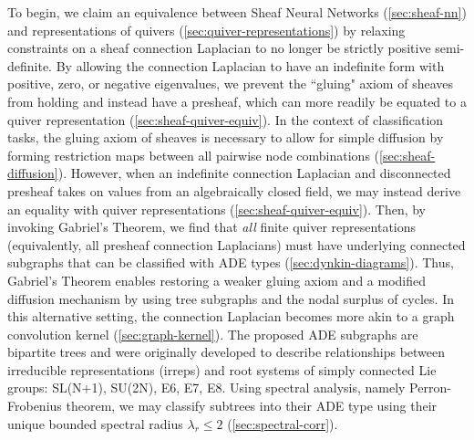 \documentclass{article}
\theoremstyle{definition}
\begin{document}

To begin, we claim an equivalence between Sheaf Neural Networks (\cref{sec:sheaf-nn}) and representations of quivers (\cref{sec:quiver-representations}) by relaxing constraints on a sheaf connection Laplacian to no longer be strictly positive semi-definite. 
By allowing the connection Laplacian to have an indefinite form with positive, zero, or negative eigenvalues, we prevent the ``gluing" axiom of sheaves from holding and instead have a presheaf, which can more readily be equated to a quiver representation (\cref{sec:sheaf-quiver-equiv}). 
In the context of classification tasks, the gluing axiom of sheaves is necessary to allow for simple diffusion by forming restriction maps between all pairwise node combinations (\cref{sec:sheaf-diffusion}). 
However, when an indefinite connection Laplacian and disconnected presheaf takes on values from an algebraically closed field, we may instead derive an equality with quiver representations (\cref{sec:sheaf-quiver-equiv}). Then, by invoking Gabriel's Theorem, we find that \textit{all} finite quiver representations (equivalently, all presheaf connection Laplacians) must have underlying connected subgraphs that can be classified with ADE types (\cref{sec:dynkin-diagrams}). 
Thus, Gabriel's Theorem enables restoring a weaker gluing axiom and a modified diffusion mechanism by using tree subgraphs and the nodal surplus of cycles. 
In this alternative setting, the connection Laplacian becomes more akin to a graph convolution kernel (\cref{sec:graph-kernel}).
The proposed ADE subgraphs are bipartite trees and were originally developed to describe relationships between irreducible representations (irreps) and root systems of simply connected Lie groups: SL(N+1), SU(2N), E6, E7, E8. 
Using spectral analysis, namely Perron-Frobenius theorem, we may classify subtrees into their ADE type using their unique bounded spectral radius $\lambda_r \leq 2$ (\cref{sec:spectral-corr}). 
\end{document}
